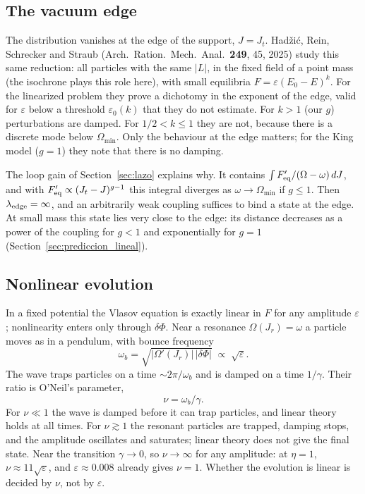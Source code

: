 \documentclass[11pt,a4paper]{article}
\begin{document}
\subsection{The vacuum edge}
\label{sec:borde}

The distribution vanishes at the edge of the support, $J=J_t$. Hadžić, Rein, Schrecker
and Straub (Arch.\ Ration.\ Mech.\ Anal.\ \textbf{249}, 45, 2025) study this same
reduction: all particles with the same $|L|$, in the fixed field of a point mass (the
isochrone plays this role here), with small equilibria $F=\varepsilon(E_0-E)^k$. For
the linearized problem they prove a dichotomy in the exponent of the edge, valid for
$\varepsilon$ below a threshold $\varepsilon_0(k)$ that they do not estimate. For $k>1$
(our $g$) perturbations are damped. For $1/2<k\le1$ they are not, because there is a
discrete mode below $\Omega_{\min}$. Only the behaviour at the edge matters; for the
King model ($g=1$) they note that there is no damping.

The loop gain of Section~\ref{sec:lazo} explains why. It contains
$\int F_{\rm eq}'/(\Omega-\omega)\,dJ$, and with $F_{\rm eq}'\propto(J_t-J)^{g-1}$ this integral diverges
as $\omega\to\Omega_{\min}$ if $g\le1$. Then $\lambda_{\rm edge}=\infty$, and an arbitrarily weak coupling
suffices to bind a state at the edge. At small mass this state lies very close to the
edge: its distance decreases as a power of the coupling for $g<1$ and exponentially for
$g=1$ (Section~\ref{sec:prediccion_lineal}).

\subsection{Nonlinear evolution}
\label{sec:nolineal}

In a fixed potential the Vlasov equation is exactly linear in $F$ for any amplitude
$\varepsilon$; nonlinearity enters only through $\delta\Phi$. Near a resonance
$\Omega(J_r)=\omega$ a particle moves as in a pendulum, with bounce frequency
\[
  \omega_b=\sqrt{|\Omega'(J_r)|\,|\delta\Phi|}\;\propto\;\sqrt{\varepsilon}.
\]
The wave traps particles on a time $\sim2\pi/\omega_b$ and is damped on a time
$1/\gamma$. Their ratio is O'Neil's parameter,
\[
  \nu=\omega_b/\gamma .
\]
For $\nu\ll1$ the wave is damped before it can trap particles, and linear theory holds
at all times. For $\nu\gtrsim1$ the resonant particles are trapped, damping stops, and
the amplitude oscillates and saturates; linear theory does not give the final state.
Near the transition $\gamma\to0$, so $\nu\to\infty$ for any amplitude: at $\eta=1$,
$\nu\approx11\sqrt\varepsilon$, and $\varepsilon\approx0.008$ already gives $\nu=1$.
Whether the evolution is linear is decided by $\nu$, not by $\varepsilon$.
\end{document}
